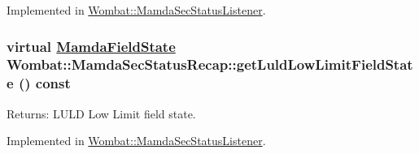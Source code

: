 Implemented in \hyperlink{classWombat_1_1MamdaSecStatusListener_9a2b08e93ceb9deb618edac1e71075f3}{Wombat::Mamda\-Sec\-Status\-Listener}.\hypertarget{classWombat_1_1MamdaSecStatusRecap_8d51b8657752bef75f47ede1edd1ae6b}{
\subsubsection[getLuldLowLimitFieldState]{\setlength{\rightskip}{0pt plus 5cm}virtual \hyperlink{namespaceWombat_93aac974f2ab713554fd12a1fa3b7d2a}{Mamda\-Field\-State} Wombat::Mamda\-Sec\-Status\-Recap::get\-Luld\-Low\-Limit\-Field\-State () const}}
\label{classWombat_1_1MamdaSecStatusRecap_8d51b8657752bef75f47ede1edd1ae6b}


\begin{Desc}
\item[Returns:]LULD Low Limit field state. \end{Desc}


Implemented in \hyperlink{classWombat_1_1MamdaSecStatusListener_ec9193e6cfd9d44150815af67ea2fbac}{Wombat::Mamda\-Sec\-Status\-Listener}.
